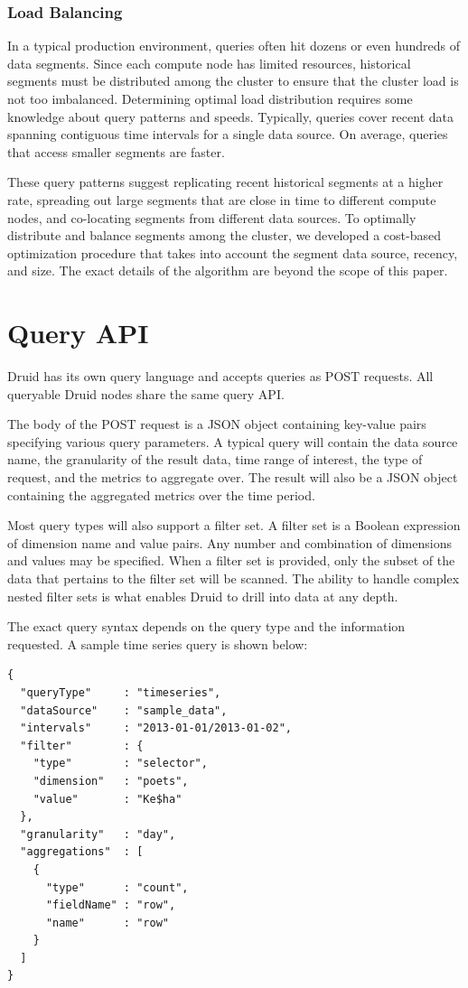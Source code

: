 \documentclass{vldb}
\begin{document}
\subsubsection{Load Balancing}
In a typical production environment, queries often hit dozens or even
hundreds of data segments. Since each compute node has limited
resources, historical segments must be distributed among the cluster
to ensure that the cluster load is not too imbalanced. Determining
optimal load distribution requires some knowledge about query patterns
and speeds. Typically, queries cover recent data spanning contiguous
time intervals for a single data source.  On average, queries that
access smaller segments are faster.

These query patterns suggest replicating recent historical segments at
a higher rate, spreading out large segments that are close in time to
different compute nodes, and co-locating segments from different data
sources.  To optimally distribute and balance segments among the
cluster, we developed a cost-based optimization procedure that takes
into account the segment data source, recency, and size. The exact
details of the algorithm are beyond the scope of this paper.

\section{Query API}
\label{sec:query-api}
Druid has its own query language and accepts queries as POST requests. All queryable
Druid nodes share the same query API.

The body of the POST request is
a JSON object containing key-value pairs specifying various query
parameters. A typical query will contain the data source name, the
granularity of the result data, time range of interest, the
type of request, and the metrics to aggregate over. The result will also be a JSON object
containing the aggregated metrics over the time period.

Most query types will also support a filter set. A filter set is a Boolean expression of dimension name and value
pairs. Any number and combination of dimensions and values may be specified.
When a filter set is provided, only the subset of the data that pertains to the filter set will be scanned.
The ability to handle complex nested filter sets is what enables Druid 
to drill into data at any depth.

The exact query syntax depends on the query type and the information requested.
A sample time series query is shown below:
\begin{verbatim}
{
  "queryType"     : "timeseries",
  "dataSource"    : "sample_data",
  "intervals"     : "2013-01-01/2013-01-02",
  "filter"        : {
    "type"        : "selector",
    "dimension"   : "poets",
    "value"       : "Ke$ha"
  },
  "granularity"   : "day",
  "aggregations"  : [
    {
      "type"      : "count",
      "fieldName" : "row",
      "name"      : "row"
    }
  ]
}
\end{verbatim}
\end{document}
